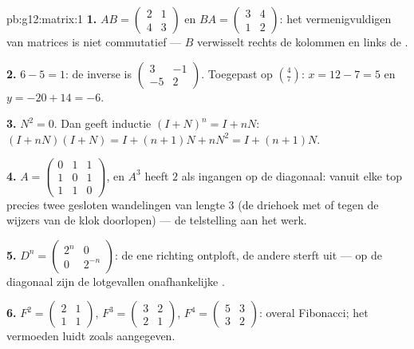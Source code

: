 \begin{solution}{pb:g12:matrix:1}
\textbf{1.} $AB = \begin{pmatrix} 2 & 1\\ 4 & 3\end{pmatrix}$ en
$BA = \begin{pmatrix} 3 & 4\\ 1 & 2\end{pmatrix}$: het vermenigvuldigen van
matrices is niet commutatief --- $B$ verwisselt rechts de kolommen en links de
.

\textbf{2.}  $6 - 5 = 1$: de inverse is
$\begin{pmatrix} 3 & -1\\ -5 & 2\end{pmatrix}$. Toegepast op $\binom{4}{7}$:
$x = 12 - 7 = 5$ en $y = -20 + 14 = -6$.

\textbf{3.} $N^2 = 0$. Dan geeft inductie $(I + N)^n = I + nN$:
$(I + nN)(I + N) = I + (n+1)N + nN^2 = I + (n+1)N$.

\textbf{4.} $A = \begin{pmatrix} 0&1&1\\ 1&0&1\\ 1&1&0 \end{pmatrix}$, en
$A^3$ heeft $2$ als ingangen op de diagonaal: vanuit elke top precies twee
gesloten wandelingen van lengte $3$ (de driehoek met of tegen de wijzers van
de klok doorlopen) --- de telstelling aan het werk.

\textbf{5.} $D^n = \begin{pmatrix} 2^n & 0\\ 0 & 2^{-n} \end{pmatrix}$: de ene
richting ontploft, de andere sterft uit --- op de diagonaal zijn de lotgevallen
onafhankelijke .

\textbf{6.} $F^2 = \begin{pmatrix} 2 & 1\\ 1 & 1\end{pmatrix}$,
$F^3 = \begin{pmatrix} 3 & 2\\ 2 & 1\end{pmatrix}$,
$F^4 = \begin{pmatrix} 5 & 3\\ 3 & 2\end{pmatrix}$: overal Fibonacci; het
vermoeden luidt zoals aangegeven.


\end{solution}
